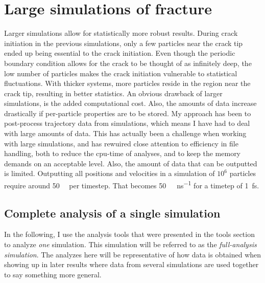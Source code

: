\section{Large simulations of fracture}
Larger simulations allow for statistically more robust results. During crack initiation in the previous simulations, only a few particles near the crack tip ended up being essential to the crack initiation. Even though the periodic boundary condition allows for the crack to be thought of as infinitely deep, the low number of particles makes the crack initiation vulnerable to statistical fluctuations. With thicker systems, more particles reside in the region near the crack tip, resulting in better statistics. An obvious drawback of larger simulations, is the added computational cost. Also, the amounts of data increase drastically if per-particle properties are to be stored. My approach has been to post-process trajectory data from simulations, which means I have had to deal with large amounts of data. This has actually been a challenge when working with large simulations, and has rewuired close attention to efficiency in file handling, both to reduce the cpu-time of analyses, and to keep the memory demands on an acceptable level. Also, the amount of data that can be outputted is limited. Outputting all positions and velocities in a simulation of $10^6$ particles require around \SI{50}{\mega\byte} per timestep. That becomes \SI{50}{\tera\byte\per\nano\second} for a timetep of \SI{1}{\femto\second}.
\subsection{Complete analysis of a single simulation}
\label{sec:complete_analysis_single_simulation}

In the following, I use the analysis tools that were presented in the tools section to analyze \emph{one} simulation. This simulation will be referred to as the \emph{full-analysis simulation}. The analyzes here will be representative of how data is obtained when showing up in later results where data from several simulations are used together to say something more general.

